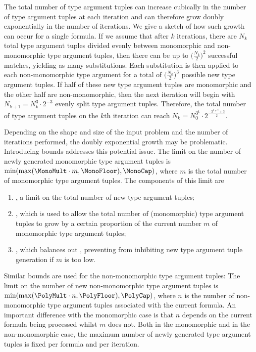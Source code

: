 \documentclass[runningheads]{llncs}
\begin{document}
The total number of type argument tuples can increase cubically in the number of type argument tuples at each iteration and can therefore grow doubly exponentially in the number of iterations. We give a sketch of how such growth can occur for a single formula. If we assume that after \(k\) iterations, there are \(N_k\) total type argument tuples divided evenly between monomorphic and non-monomorphic type argument tuples, then there can be up to \(\bigl(\frac{N_k}{2}\bigr)^2\) successful matches, yielding as many substitutions. Each substitution is then applied to each non-monomorphic type argument for a total of \(\bigl(\frac{N_k}{2}\bigr)^3\) possible new type argument tuples. If half of these new type argument tuples are monomorphic and the other half are non-monomorphic, then the next iteration will begin with \(N_{k+1} = N_k^3 \cdot 2^{-3}\) evenly split type argument tuples. Therefore, the total number of type argument tuples on the \(k\)th iteration can reach \(N_k = N_0^{3^k} \cdot 2^{\frac{-3^{k+2}+3}{2}}\).

   Depending on the shape and size of the input problem and the number of iterations performed, the doubly exponential growth may be problematic. Introducing bounds addresses this potential issue. The limit on the number of newly generated monomorphic type argument tuples is \(\min(\max(\MonoMult\cdot m, \MonoFloor), \MonoCap)\), where \(m\) is the total number of monomorphic type argument tuples. The components of this limit are
\begin{enumerate}
   \item \MonoCap, a %
   limit on the total number of new type argument tuples;
   \item \MonoMult, which is used to allow the total number of (monomorphic) type argument tuples to grow by a certain proportion of the current number \(m\) of monomorphic type argument tuples;
   \item \MonoFloor, which balances out \MonoMult, preventing \MonoMult from inhibiting new type argument tuple generation if \(m\) is too low.
\end{enumerate}

Similar bounds are used for the non-monomorphic type argument tuples:
The limit on the number of new non-monomorphic type argument tuples is \(\min(\max(\PolyMult\cdot n, \PolyFloor),\allowbreak \PolyCap)\), where \(n\) is the number of non-monomorphic type argument tuples associated with the current formula. An important difference with the monomorphic case is that \(n\) depends on the current formula being processed whilst \(m\) does not.
Both in the monomorphic and in the non-monomorphic case, the maximum number of newly generated type argument tuples is fixed per formula and per iteration.
\end{document}
